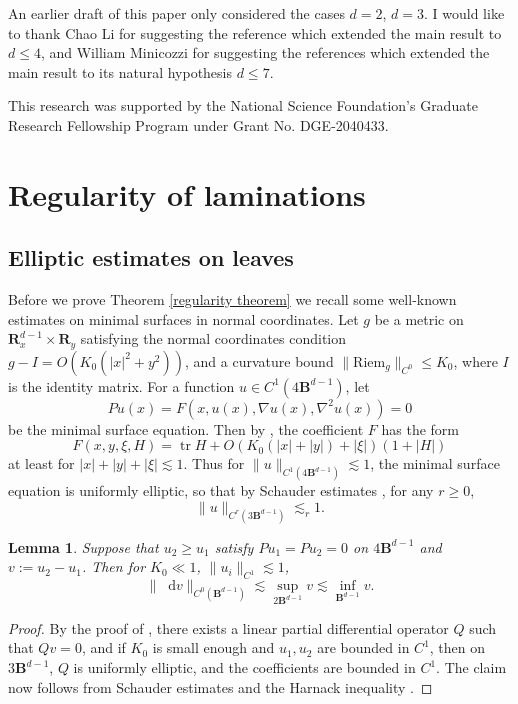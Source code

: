 \documentclass[reqno,11pt]{amsart}
\newcommand{\RR}{\mathbf{R}}
\newcommand{\Ball}{\mathbf{B}}
\newcommand*\dif{\mathop{}\!\mathrm{d}}
\DeclareMathOperator{\tr}{tr}
\newcommand{\Riem}{\mathrm{Riem}}
\newtheorem{lemma}[theorem]{Lemma}
\theoremstyle{definition}
\numberwithin{equation}{section}
\begin{document}
An earlier draft of this paper only considered the cases $d = 2$, $d = 3$.
I would like to thank Chao Li for suggesting the reference \cite{chodosh2022complete} which extended the main result to $d \leq 4$, and William Minicozzi for suggesting the references \cite{Schoen75, Schoen81} which extended the main result to its natural hypothesis $d \leq 7$.

This research was supported by the National Science Foundation's Graduate Research Fellowship Program under Grant No. DGE-2040433.



\section{Regularity of laminations}\label{Regularity}
\subsection{Elliptic estimates on leaves}\label{Leaf estimates}
Before we prove Theorem \ref{regularity theorem} we recall some well-known estimates on minimal surfaces in normal coordinates.
Let $g$ be a metric on $\RR^{d - 1}_x \times \RR_y$ satisfying the normal coordinates condition $g - I = O(K_0(|x|^2 + y^2))$, and a curvature bound $\|\Riem_g\|_{C^0} \leq K_0$, where $I$ is the identity matrix.
For a function $u \in C^1(4\Ball^{d - 1})$, let
$$Pu(x) = F(x, u(x), \nabla u(x), \nabla^2 u(x)) = 0$$
be the minimal surface equation.
Then by \cite[(7.21)]{colding2011course}, the coefficient $F$ has the form
$$F(x, y, \xi, H) = \tr H + O(K_0(|x| + |y|) + |\xi|)(1 + |H|)$$
at least for $|x| + |y| + |\xi| \lesssim 1$.
Thus for $\|u\|_{C^1(4\Ball^{d - 1})} \lesssim 1$, the minimal surface equation is uniformly elliptic, so that by Schauder estimates \cite[Theorem 6.2]{gilbarg2015elliptic}, for any $r \geq 0$,
\begin{equation}\label{norms on uk}
	\|u\|_{C^r(3\Ball^{d - 1})} \lesssim_r 1.
\end{equation}

\begin{lemma}
Suppose that $u_2 \geq u_1$ satisfy $Pu_1 = Pu_2 = 0$ on $4\Ball^{d - 1}$ and $v := u_2 - u_1$.
Then for $K_0 \ll 1$, $\|u_i\|_{C^1} \lesssim 1$, 
\begin{equation}\label{Schauder Harnack}
	\|\dif v\|_{C^0(\Ball^{d - 1})} \lesssim \sup_{2\Ball^{d - 1}} v \lesssim \inf_{\Ball^{d - 1}} v.
\end{equation}
\end{lemma}
\begin{proof}
By the proof of \cite[Theorem 7.3]{colding2011course}, there exists a linear partial differential operator $Q$ such that $Qv = 0$, and if $K_0$ is small enough and $u_1, u_2$ are bounded in $C^1$, then on $3\Ball^{d - 1}$, $Q$ is uniformly elliptic, and the coefficients are bounded in $C^1$.
The claim now follows from Schauder estimates and the Harnack inequality \cite[Corollary 9.25]{gilbarg2015elliptic}.
\end{proof}
\end{document}
